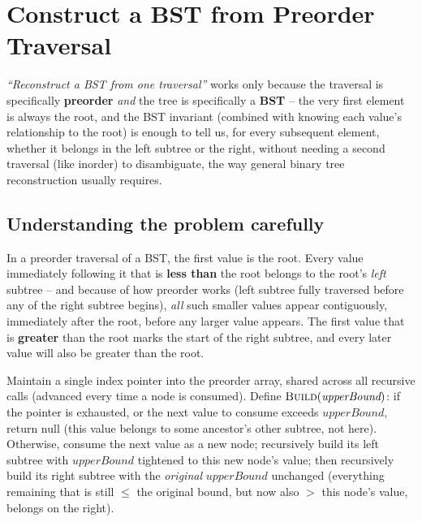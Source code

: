 \section{Construct a BST from Preorder Traversal}
\label{sec:bst-construct-preorder}


\begin{patternbox}
\emph{``Reconstruct a BST from one traversal''} works only because the
traversal is specifically \textbf{preorder} \emph{and} the tree is
specifically a \textbf{BST} -- the very first element is always the root,
and the BST invariant (combined with knowing each value's relationship to
the root) is enough to tell us, for every subsequent element, whether it
belongs in the left subtree or the right, without needing a second
traversal (like inorder) to disambiguate, the way general binary tree
reconstruction usually requires.
\end{patternbox}

\subsection*{Understanding the problem carefully}

In a preorder traversal of a BST, the first value is the root. Every
value immediately following it that is \textbf{less than} the root
belongs to the root's \emph{left} subtree -- and because of how preorder
works (left subtree fully traversed before any of the right subtree
begins), \emph{all} such smaller values appear contiguously, immediately
after the root, before any larger value appears. The first value that is
\textbf{greater} than the root marks the start of the right subtree, and
every later value will also be greater than the root.

\begin{ideabox}
Maintain a single index pointer into the preorder array, shared across
all recursive calls (advanced every time a node is consumed). Define
$\textsc{Build}(\textit{upperBound})$: if the pointer is exhausted, or
the next value to consume exceeds $\textit{upperBound}$, return null
(this value belongs to some ancestor's other subtree, not here). Otherwise,
consume the next value as a new node; recursively build its left subtree
with $\textit{upperBound}$ tightened to this new node's value; then
recursively build its right subtree with the \emph{original}
$\textit{upperBound}$ unchanged (everything remaining that is still
$\le$ the original bound, but now also $>$ this node's value, belongs on
the right).
\end{ideabox}

